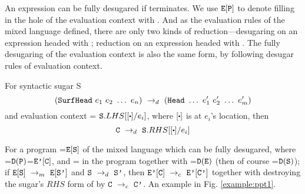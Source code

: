 An expression  can be fully desugared if  terminates. We use $\mbox{\tt E}[\mbox{\tt P}]$ to denote filling in the hole of the evaluation context  with . And as the evaluation rules of the mixed language defined, there are only two kinds of reduction---desugaring on an expression headed with ; reduction on an expression headed with . The fully desugaring of the evaluation context is also the same form, by following desugar rules of evaluation context.

\begin{Def}
	For syntactic sugar S
	\[
	(\mbox{\tt SurfHead}~e_1~e_2~\ldots~e_n) ~\rightarrow_d~ (\mbox{\tt Head}~\ldots~e_1'~e_2'~\ldots~e_m')
	\]
	and evaluation context  = $\m{S}.LHS[[\bigcdot]/e_i]$, where $[\bigcdot]$ is at $e_i$'s location, then
	\[
	\drule{\m{C}}{\m{S}.RHS[[\bigcdot]/e_i]}
	\]

	\end{Def}


\begin{property} \label{thm1}
	For a program =$\mbox{\tt E}[\mbox{\tt S}]$ of the mixed language which can be fully desugared, where =$\mathtt{D}(\mbox{\tt P})$=$\mbox{\tt E'}[\mbox{\tt C}]$, and = in the program  together with =$\mathtt{D}(\mbox{\tt E})$ (then of course =$\mathtt{D}(\mbox{\tt S})$); if $\mbox{\tt E}[\mbox{\tt S}] ~\rightarrow_m~\mbox{\tt E}[\mbox{\tt S'}]$ and $\mbox{\tt S} ~\rightarrow_d~ \mbox{\tt S'}$, then $\mbox{\tt E'}[\mbox{\tt C}] ~\rightarrow_c~\mbox{\tt E'}[\mbox{\tt C'}]$ together with destroying the sugar's $RHS$ form of  by $\mbox{\tt C} ~\rightarrow_c~\mbox{\tt C'}$. An example in Fig. \ref{example:ppt1}.
\end{property}

